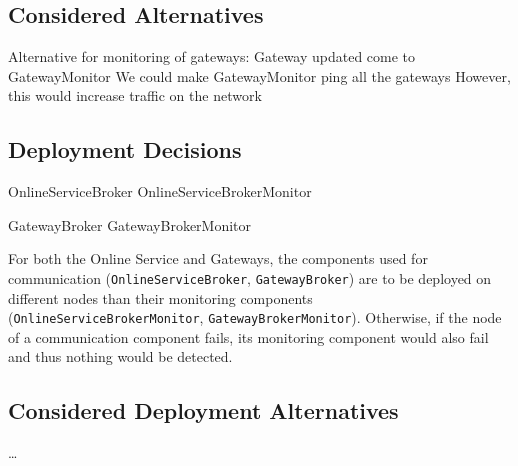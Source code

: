     \subsection*{Considered Alternatives}
         Alternative for monitoring of gateways:
        Gateway updated come to GatewayMonitor
        We could make GatewayMonitor ping all the gateways
        However, this would increase traffic on the network

    \subsection*{Deployment Decisions}
        OnlineServiceBroker
        OnlineServiceBrokerMonitor

        GatewayBroker
        GatewayBrokerMonitor

        For both the Online Service and Gateways, the components used for communication
        (\texttt{OnlineServiceBroker}, \texttt{GatewayBroker}) are to be deployed on different nodes than
        their monitoring components (\texttt{OnlineServiceBrokerMonitor}, \texttt{GatewayBrokerMonitor}).
        Otherwise, if the node of a communication
        component fails, its monitoring component would also fail and thus
        nothing would be detected.

    \subsection*{Considered Deployment Alternatives}
        \ldots
